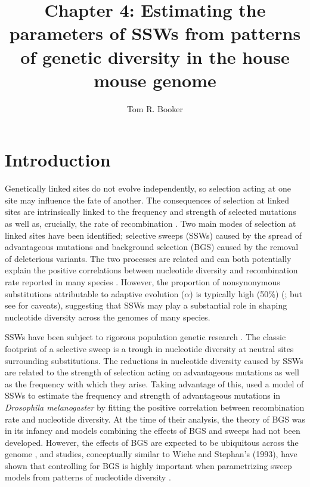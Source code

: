 \documentclass[11pt]{article}
\title{\textbf{Chapter 4:} Estimating the parameters of SSWs from patterns of genetic diversity in the house mouse genome}
\author[1,*]{Tom R. Booker}
\affil[1]{Institute of Evolutionary Biology, University of Edinburgh, Edinburgh}
\begin{document}
\maketitle
\begin{abstract}


\end{abstract}

%
%
\section*{Introduction}

	Genetically linked sites do not evolve independently, so selection acting at one site may influence the fate of another. The consequences of selection at linked sites are intrinsically linked to the frequency and strength of selected mutations as well as, crucially, the rate of recombination \citep{RN124,RN206,RN287,RN157}. Two main modes of selection at linked sites have been identified; selective sweeps (SSWs) caused by the spread of advantageous mutations and background selection (BGS) caused by the removal of deleterious variants. The two processes are related and can both potentially explain the positive correlations between nucleotide diversity and recombination rate reported in many species \citep{RN117}. However, the proportion of nonsynonymous substitutions attributable to adaptive evolution ($\alpha$) is typically high (50\%) (\citealt{RN215}; but see \citealt{RN352} for caveats), suggesting that SSWs may play a substantial role in shaping nucleotide diversity across the genomes of many species.

	SSWs have been subject to rigorous population genetic research \citep{RN124, RN226, RN278, RN235}. The classic footprint of a selective sweep is a trough in nucleotide diversity at neutral sites surrounding substitutions. The reductions in nucleotide diversity caused by SSWs are related to the strength of selection acting on advantageous mutations as well as the frequency with which they arise. Taking advantage of this, \cite{RN277} used a model of SSWs to estimate the frequency and strength of advantageous mutations in \textit{Drosophila melanogaster} by fitting the positive correlation between recombination rate and nucleotide diversity. At the time of their analysis, the theory of BGS was in its infancy and models combining the effects of BGS and sweeps had not been developed. However, the effects of BGS are expected to be ubiquitous across the genome \citep{RN116, RN274, RN120}, and studies, conceptually similar to Wiehe and Stephan's (1993), have shown that controlling for BGS is highly important when parametrizing sweep models from patterns of nucleotide diversity \citep{RN290, RN274}.
\end{document}
